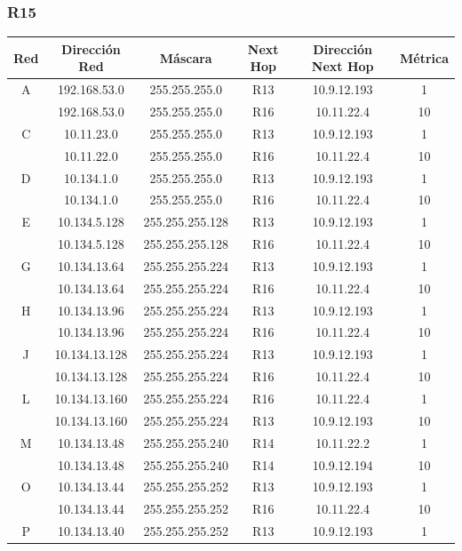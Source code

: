 \documentclass[12pt, a4paper, spanish]{article}
\begin{document}
\subsubsection{R15}
\begin{center}
\begin{tabular}{|c|c|c|c|c|c|}
	\hline
	Red & Dirección Red & Máscara & Next Hop & Dirección Next Hop & Métrica \\
	\hline
	\hline
	A & 192.168.53.0 & 255.255.255.0 & R13 & 10.9.12.193 & 1\\
	 & 192.168.53.0 & 255.255.255.0 & R16 & 10.11.22.4 & 10\\
	\hline
	C & 10.11.23.0 & 255.255.255.0 & R13 & 10.9.12.193 & 1\\
	 & 10.11.22.0 & 255.255.255.0 & R16 & 10.11.22.4 & 10\\
	\hline
	D & 10.134.1.0 & 255.255.255.0 & R13 & 10.9.12.193 & 1\\
	 & 10.134.1.0 & 255.255.255.0 & R16 & 10.11.22.4 & 10\\
	\hline
	E & 10.134.5.128 & 255.255.255.128 & R13 & 10.9.12.193 & 1\\
	 & 10.134.5.128 & 255.255.255.128 & R16 & 10.11.22.4 & 10\\
	\hline
	G & 10.134.13.64 & 255.255.255.224 & R13 & 10.9.12.193 & 1\\
	 & 10.134.13.64 & 255.255.255.224 & R16 & 10.11.22.4 & 10\\
	\hline
	H & 10.134.13.96 & 255.255.255.224 & R13 & 10.9.12.193 & 1\\
	 & 10.134.13.96 & 255.255.255.224 & R16 & 10.11.22.4 & 10\\
	\hline
	J & 10.134.13.128 & 255.255.255.224 & R13 & 10.9.12.193 & 1\\
	 & 10.134.13.128 & 255.255.255.224 & R16 & 10.11.22.4 & 10\\
	\hline
	L & 10.134.13.160 & 255.255.255.224 & R16 & 10.11.22.4 & 1\\
	 & 10.134.13.160 & 255.255.255.224 & R13 & 10.9.12.193 & 10\\
	\hline
	M & 10.134.13.48 & 255.255.255.240 & R14 & 10.11.22.2 & 1\\
	 & 10.134.13.48 & 255.255.255.240 & R14 & 10.9.12.194 & 10\\
	\hline
	O & 10.134.13.44 & 255.255.255.252 & R13 & 10.9.12.193 & 1\\
	 & 10.134.13.44 & 255.255.255.252 & R16 & 10.11.22.4 & 10\\
	\hline
	P & 10.134.13.40 & 255.255.255.252 & R13 & 10.9.12.193 & 1\\

\end{tabular}
\end{center}
\end{document}
